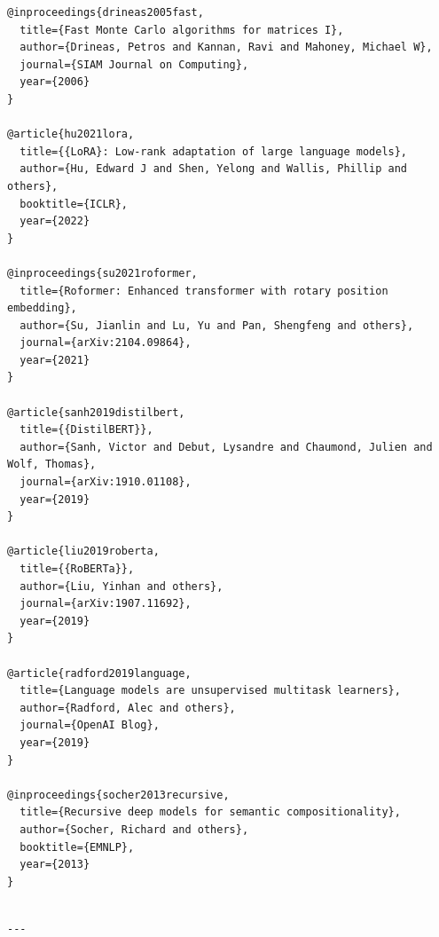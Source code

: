 \begin{lstlisting}
@inproceedings{drineas2005fast,
  title={Fast Monte Carlo algorithms for matrices I},
  author={Drineas, Petros and Kannan, Ravi and Mahoney, Michael W},
  journal={SIAM Journal on Computing},
  year={2006}
}

@article{hu2021lora,
  title={{LoRA}: Low-rank adaptation of large language models},
  author={Hu, Edward J and Shen, Yelong and Wallis, Phillip and others},
  booktitle={ICLR},
  year={2022}
}

@inproceedings{su2021roformer,
  title={Roformer: Enhanced transformer with rotary position embedding},
  author={Su, Jianlin and Lu, Yu and Pan, Shengfeng and others},
  journal={arXiv:2104.09864},
  year={2021}
}

@article{sanh2019distilbert,
  title={{DistilBERT}},
  author={Sanh, Victor and Debut, Lysandre and Chaumond, Julien and Wolf, Thomas},
  journal={arXiv:1910.01108},
  year={2019}
}

@article{liu2019roberta,
  title={{RoBERTa}},
  author={Liu, Yinhan and others},
  journal={arXiv:1907.11692},
  year={2019}
}

@article{radford2019language,
  title={Language models are unsupervised multitask learners},
  author={Radford, Alec and others},
  journal={OpenAI Blog},
  year={2019}
}

@inproceedings{socher2013recursive,
  title={Recursive deep models for semantic compositionality},
  author={Socher, Richard and others},
  booktitle={EMNLP},
  year={2013}
}
\end{lstlisting}
\begin{lstlisting}

---
\end{lstlisting}